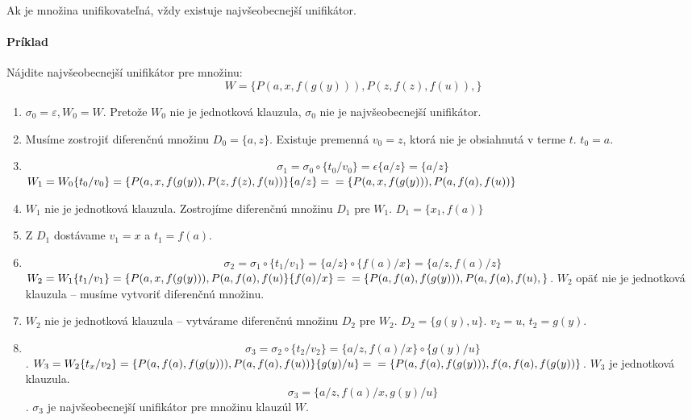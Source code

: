 Ak je množina unifikovateľná, vždy existuje najvšeobecnejší unifikátor.

\paragraph{Príklad}
Nájdite najvšeobecnejší unifikátor pre množinu: $$W=\{ P(a,x,f(g(y))),
P(z,f(z),f(u)), \}$$

\begin{enumerate}
	\item $\sigma_0 = \varepsilon, W_0 = W$. Pretože $W_0$ nie je jednotková
	klauzula, $\sigma_0$ nie je najvšeobecnejší unifikátor.
	\item Musíme zostrojiť diferenčnú množinu $D_0 = \{a, z\}$. Existuje
	premenná $v_0 = z$, ktorá nie je obsiahnutá v terme $t$. $t_0 = a$.
	\item $$\sigma_1 = \sigma_0 \circ \{ t_0/v_0 \} = \epsilon \{a/z\} =
	\{a/z\}$$ $W_1 = W_0\{ t_0/v_0 \} = \{P(a,x,f(g(y)),
	P(z,f(z),f(u))\}\{a/z\} =  \\
	= \{P(a,x,f(g(y))), P(a, f(a), f(u))\}$

	\item $W_1$ nie je jednotková klauzula. Zostrojíme diferenčnú množinu
	$D_1$ pre $W_1$. $D_1 = \{x_1, f(a)\}$

	\item Z $D_1$ dostávame $v_1 = x$ a $t_1 = f(a)$.
	\item $$\sigma_2 = \sigma_1 \circ \{ t_1/v_1\}= \{a/z\} \circ \{ f(a)/x\}
	= \{a/z, f(a)/z \}$$
	$ W_2 = W_1 \{t_1/v_1\} = \{P(a,x,f(g(y))), P(a,f(a),f(u)\} \{ f(a)/x
	\} = \\
	= \{ P(a,f(a), f(g(y))), P(a,f(a), f(u), \}$. $W_2$ opäť nie je
	jednotková klauzula -- musíme vytvoriť diferenčnú množinu.

	\item $W_2$ nie je jednotková klauzula -- vytvárame diferenčnú množinu
	$D_2$ pre $W_2$. $D_2 = \{ g(y), u \}$. $v_2 = u$, $t_2 = g(y)$.

	\item $$\sigma_3 = \sigma_2 \circ \{t_2/v_2\} = \{a/z, f(a)/x\} \circ
	\{g(y)/u\}$$.
	$W_3 = W_2 \{ t_x/v_2\} = \{ P(a,f(a), f(g(y))), P(a,f(a),
	f(u))\}\{g(y)/u\} = \\
	= \{ P(a, f(a), f(g(y))), f(a, f(a), f(g(y)) \}$.
	$W_3$ je jednotková klauzula.
	$$ \sigma_3 = \{ a/z, f(a)/x, g(y)/u\}$$. $\sigma_3$ je najvšeobecnejší
	unifikátor pre množinu klauzúl $W$.
\end{enumerate}

